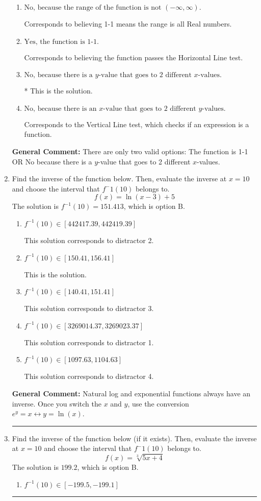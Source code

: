\documentclass{extbook}[14pt]
\newcommand{\litem}[1]{\item #1

\rule{\textwidth}{0.4pt}}
\begin{document}
\begin{enumerate}
{\begin{enumerate}[label=\Alph*.]
Corresponds to believing 1-1 means the domain is all Real numbers.
\item \( \text{No, because the range of the function is not $(-\infty, \infty)$.} \)

Corresponds to believing 1-1 means the range is all Real numbers.
\item \( \text{Yes, the function is 1-1.} \)

Corresponds to believing the function passes the Horizontal Line test.
\item \( \text{No, because there is a $y$-value that goes to 2 different $x$-values.} \)

* This is the solution.
\item \( \text{No, because there is an $x$-value that goes to 2 different $y$-values.} \)

Corresponds to the Vertical Line test, which checks if an expression is a function.
\end{enumerate}

\textbf{General Comment:} There are only two valid options: The function is 1-1 OR No because there is a $y$-value that goes to 2 different $x$-values.
}
\litem{
Find the inverse of the function below. Then, evaluate the inverse at $x = 10$ and choose the interval that $f^-1(10)$ belongs to.
\[ f(x) = \ln{(x-3)}+5 \]The solution is \( f^{-1}(10) = 151.413 \), which is option B.\begin{enumerate}[label=\Alph*.]
\item \( f^{-1}(10) \in [442417.39, 442419.39] \)

 This solution corresponds to distractor 2.
\item \( f^{-1}(10) \in [150.41, 156.41] \)

 This is the solution.
\item \( f^{-1}(10) \in [140.41, 151.41] \)

 This solution corresponds to distractor 3.
\item \( f^{-1}(10) \in [3269014.37, 3269023.37] \)

 This solution corresponds to distractor 1.
\item \( f^{-1}(10) \in [1097.63, 1104.63] \)

 This solution corresponds to distractor 4.
\end{enumerate}

\textbf{General Comment:} Natural log and exponential functions always have an inverse. Once you switch the $x$ and $y$, use the conversion $ e^y = x \leftrightarrow y=\ln(x)$.
}
\litem{
Find the inverse of the function below (if it exists). Then, evaluate the inverse at $x = 10$ and choose the interval that $f^-1(10)$ belongs to.
\[ f(x) = \sqrt[3]{5 x + 4} \]The solution is \( 199.2 \), which is option B.\begin{enumerate}[label=\Alph*.]
\item \( f^{-1}(10) \in [-199.5, -199.1] \)


\end{enumerate}}
\end{enumerate}
\end{document}
